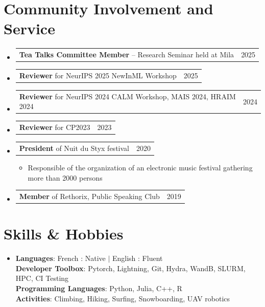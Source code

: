 \documentclass[letterpaper,11pt]{article}
\makeatletter
\newcommand{\resumeItem}[1]{
  \item\small{
    {#1 \vspace{-2pt}}
  }
}
\newcommand{\resumeProjectHeading}[2]{
    \item
    \begin{tabular*}{0.97\textwidth}{l@{\extracolsep{\fill}}r}
      \small#1 & #2 \\
    \end{tabular*}\vspace{-7pt}
}
\newcommand{\resumeSubHeadingListStart}{\begin{itemize}[leftmargin=0.15in, label={}]}
\newcommand{\resumeSubHeadingListEnd}{\end{itemize}}
\newcommand{\resumeItemListStart}{\begin{itemize}}
\newcommand{\resumeItemListEnd}{\end{itemize}\vspace{-5pt}}
\makeatother
\begin{document}
\section{Community Involvement and Service}
\resumeSubHeadingListStart
  \resumeProjectHeading
    {\textbf{Tea Talks Committee Member }– Research Seminar held at Mila}{2025}
  \resumeProjectHeading
    {\textbf{Reviewer} for NeurIPS 2025 NewInML Workshop}{2025}
  \resumeProjectHeading
    {\textbf{Reviewer} for NeurIPS 2024 CALM Workshop, MAIS 2024, HRAIM 2024}{2024}
  \resumeProjectHeading
    {\textbf{Reviewer} for CP2023}{2023}
  \resumeProjectHeading
    {\textbf{President} of Nuit du Styx festival}{2020}
    \resumeItemListStart
      \resumeItem{Responsible of the organization of an electronic music festival gathering more than 2000 persons}
    \resumeItemListEnd
  \resumeProjectHeading
    {\textbf{Member} of Rethorix, Public Speaking Club }{2019}
\resumeSubHeadingListEnd
\section{Skills \& Hobbies}
 \begin{itemize}[leftmargin=0.15in, label={}]
    \item{
    \textbf{Languages}{: French : Native $|$ English : Fluent }} \\
     \textbf{Developer Toolbox}{: Pytorch, Lightning, Git, Hydra, WandB, SLURM, HPC, CI Testing} \\
     \textbf{Programming Languages}{: Python, Julia, C++, R} \\
    \vspace{10pt}
     \textbf{Activities}{: Climbing, Hiking, Surfing, Snowboarding, UAV robotics }
 \end{itemize}
\end{document}
